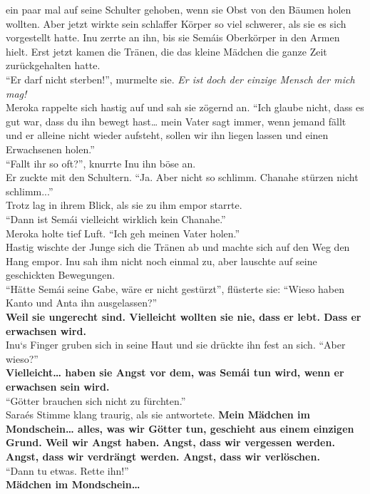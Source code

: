 ein paar mal auf seine Schulter gehoben, wenn sie Obst von den Bäumen holen wollten. Aber jetzt 
wirkte sein schlaffer Körper so viel schwerer, als sie es sich vorgestellt hatte. Inu zerrte an 
ihn, bis sie Semáis Oberkörper in den Armen hielt. Erst jetzt kamen die Tränen, die das kleine 
Mädchen die ganze Zeit zurückgehalten hatte.\\
``Er darf nicht sterben!'', murmelte sie. \textit{Er ist doch der einzige Mensch der mich mag!}\\
Meroka rappelte sich hastig auf und sah sie zögernd an. ``Ich glaube nicht, dass es gut war, dass 
du ihn bewegt hast… mein Vater sagt immer, wenn jemand fällt und er alleine nicht wieder aufsteht, 
sollen wir ihn liegen lassen und einen Erwachsenen holen.''\\
``Fallt ihr so oft?'', knurrte Inu ihn böse an.\\
Er zuckte mit den Schultern. ``Ja. Aber nicht so schlimm. Chanahe stürzen nicht schlimm...''\\
Trotz lag in ihrem Blick, als sie zu ihm empor starrte. \\
``Dann ist Semái vielleicht wirklich kein Chanahe.''\\
Meroka holte tief Luft. ``Ich geh meinen Vater holen.'' \\
Hastig wischte der Junge sich die Tränen ab und machte sich auf den Weg den Hang empor. Inu sah ihm 
nicht noch einmal zu, aber lauschte auf seine geschickten Bewegungen. \\
``Hätte Semái seine Gabe, wäre er nicht gestürzt'', flüsterte sie: ``Wieso haben Kanto und Anta 
ihn ausgelassen?''\\
\textbf{Weil sie ungerecht sind. Vielleicht wollten sie nie, dass er lebt. Dass er erwachsen 
wird.}\\
Inu‘s Finger gruben sich in seine Haut und sie drückte ihn fest an sich. ``Aber wieso?''\\
\textbf{Vielleicht… haben sie Angst vor dem, was Semái tun wird, wenn er erwachsen sein wird.}\\
``Götter brauchen sich nicht zu fürchten.''\\
Saraés Stimme klang traurig, als sie antwortete. \textbf{Mein Mädchen im Mondschein… alles, was wir 
Götter tun, geschieht aus einem einzigen Grund. Weil wir Angst haben. Angst, dass wir vergessen 
werden. Angst, dass wir verdrängt werden. Angst, dass wir verlöschen.}\\
``Dann tu etwas. Rette ihn!''\\
\textbf{Mädchen im Mondschein…}\\
